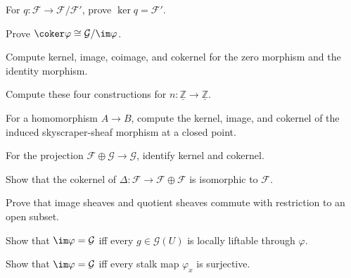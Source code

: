 \begin{exercise}\label{ex:vi15-11}
For $q:\mathcal F\to\mathcal F/\mathcal F'$, prove $\ker q=\mathcal F'$.
\end{exercise}

\begin{exercise}\label{ex:vi15-12}
Prove $\coker\varphi\cong\mathcal G/\im\varphi$.
\end{exercise}

\begin{exercise}\label{ex:vi15-13}
Compute kernel, image, coimage, and cokernel for the zero morphism and the identity morphism.
\end{exercise}

\begin{exercise}[Multiplication by $n$]\label{ex:vi15-14}
Compute these four constructions for $n:\underline{\mathbb Z}\to\underline{\mathbb Z}$.
\end{exercise}

\begin{exercise}\label{ex:vi15-15}
For a homomorphism $A\to B$, compute the kernel, image, and cokernel of the induced skyscraper-sheaf morphism at a closed point.
\end{exercise}

\begin{exercise}\label{ex:vi15-16}
For the projection $\mathcal F\oplus\mathcal G\to\mathcal G$, identify kernel and cokernel.
\end{exercise}

\begin{exercise}[Diagonal]\label{ex:vi15-17}
Show that the cokernel of $\Delta:\mathcal F\to\mathcal F\oplus\mathcal F$ is isomorphic to $\mathcal F$.
\end{exercise}

\begin{exercise}\label{ex:vi15-18}
Prove that image sheaves and quotient sheaves commute with restriction to an open subset.
\end{exercise}

\begin{exercise}\label{ex:vi15-19}
Show that $\im\varphi=\mathcal G$ iff every $g\in\mathcal G(U)$ is locally liftable through $\varphi$.
\end{exercise}

\begin{exercise}\label{ex:vi15-20}
Show that $\im\varphi=\mathcal G$ iff every stalk map $\varphi_x$ is surjective.
\end{exercise}

